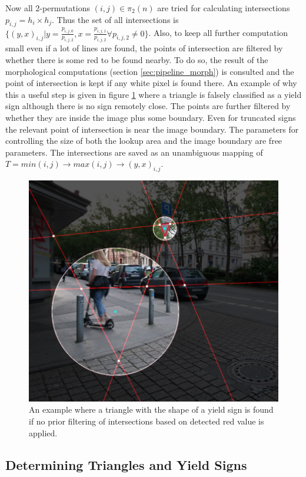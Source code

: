 \documentclass{report}
\begin{document}
Now all 2-permutations \( (i, j) \in \pi_2(n) \) are tried for
calculating intersections \( p_{i,j} = h_i \times h_j \). Thus the set
of all intersections is \(\{ (y, x)_{i, j} | y = \frac{p_{i, j,
    0}}{p_{i, j, 2}}, x = \frac{p_{i, j, 1}}{p_{i, j, 2}} \forall
p_{i, j, 2} \neq 0 \}\). Also, to keep all further computation small
even if a lot of lines are found, the points of intersection are
filtered by whether there is some red to be found nearby. To do so,
the result of the morphological computations (section
\ref{sec:pipeline_morph}) is consulted and the point of intersection
is kept if any white pixel is found there. An example of why this a
useful step is given in figure \ref{img:red_detection} where a
triangle is falsely classified as a yield sign although there is no
sign remotely close. The points are further filtered by whether they
are inside the image plus some boundary. Even for truncated signs the
relevant point of intersection is near the image boundary. The
parameters for controlling the size of both the lookup area and the
image boundary are free parameters. The intersections are saved as an
unambiguous mapping of \( T = min(i, j) \to max(i, j) \to (y, x)_{i,
  j} \).

\begin{figure}
  \centering
    \includegraphics[width=.7\textwidth, frame]{src/red_detection}
  \caption{An example where a triangle with the shape of a yield sign
    is found if no prior filtering of intersections based on detected
    red value is applied.}
  \label{img:red_detection}
\end{figure}


\subsection{Determining Triangles and Yield Signs}
\end{document}
